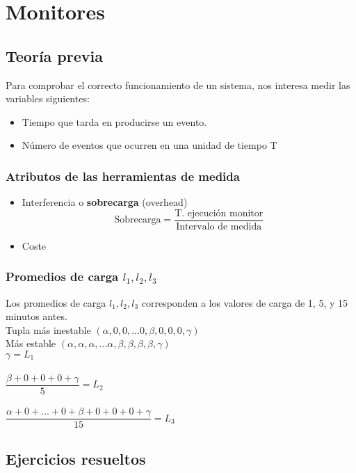 \chapter{Monitores}

\section{Teoría previa}
Para comprobar el correcto funcionamiento de un sistema, nos interesa medir las variables siguientes:
\begin{itemize}
    \item Tiempo que tarda en producirse un evento.
    \item Número de eventos que ocurren en una unidad de tiempo T
\end{itemize}
\subsection{Atributos de las herramientas de medida}
\begin{itemize}
    \item Interferencia o \textbf{sobrecarga} (overhead)
    \[
    \text{Sobrecarga} = \dfrac{\text{T. ejecución monitor}}{\text{Intervalo de medida}}
    \]
    \item Coste
\end{itemize}
\subsection{Promedios de carga $l_1, l_2, l_3$}
Los promedios de carga $l_1, l_2, l_3$ corresponden a los valores de carga de 1, 5, y 15 minutos antes.\\

Tupla más inestable $(\alpha,0,0,...0,\beta,0,0,0,\gamma)$\\
Más estable $(\alpha,\alpha,\alpha,...\alpha,\beta,\beta,\beta,\beta,\gamma)$\\
$\gamma = L_1$\\\\
$\dfrac{\beta+0+0+0+\gamma}{5} = L_2$\\\\
$\dfrac{\alpha+0+...+0+\beta+0+0+0+\gamma}{15} = L_3$\\
\newpage
\section{Ejercicios resueltos}
